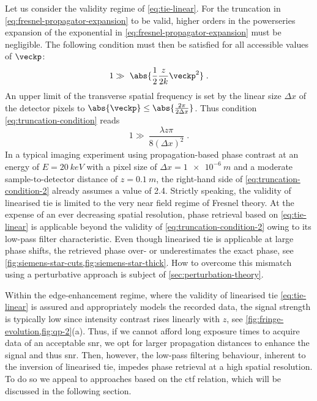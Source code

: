 \documentclass[
twoside,
openright,
titlepage,
numbers=noenddot,
headinclude,
fleqn,
a4paper,
footinclude=true,
cleardoublepage=empty,
abstractoff,
BCOR=5mm,
paper=a4,
fontsize=11pt,
british,ngerman,american,
]{scrreprt}
\begin{document}
Let us consider the validity regime of \cref{eq:tie-linear}.  For the
truncation in \cref{eq:fresnel-propagator-expansion} to be valid,
higher orders in the power\hyph series expansion of the exponential in
\cref{eq:fresnel-propagator-expansion} must be negligible.  The
following condition must then be satisfied for all accessible values
of $\veckp$:
\begin{equation}
  \label{eq:truncation-condition}
  1 \gg\ \abs{\frac12\frac{z}{2k}\veckp^2} \;.
\end{equation}
An upper limit of the transverse spatial frequency is set by the
linear size $\Delta x$ of the detector pixels to
$\abs{\veckp}\le\abs{\frac{2\pi}{2\Delta x}}$.  Thus condition
\eqref{eq:truncation-condition} reads
\begin{equation}
  \label{eq:truncation-condition-2}
  1 \gg\ \frac{\lambda z \pi}{8 (\Delta x)^2} \;.
\end{equation}
In a typical imaging experiment using propagation-based phase contrast
at an energy of $E=\SI{20}{keV}$ with a pixel size of $\Delta
x=\SI{1e-6}{m}$ and a moderate sample-to-detector distance of
$z=\SI{0.1}{m}$, the right-hand side of
\eqref{eq:truncation-condition-2} already assumes a value of 2.4.
Strictly speaking, the validity of linearised \ac{tie} is limited to
the very near field regime of Fresnel theory.  At the expense of an
ever decreasing spatial resolution, phase retrieval based on
\cref{eq:tie-linear} is applicable beyond the validity of
\cref{eq:truncation-condition-2} owing to its low-pass filter
characteristic.  Even though linearised \ac{tie} is applicable at
large phase shifts, the retrieved phase over- or underestimates the
exact phase, see \cref{fig:siemens-star-cuts,fig:siemens-star-thick}.
How to overcome this mismatch using a perturbative approach is subject
of \cref{sec:perturbation-theory}.

Within the edge-enhancement regime, where the validity of linearised
\ac{tie} \eqref{eq:tie-linear} is assured and appropriately models the
recorded data, the signal strength is typically low since intensity
contrast rises linearly with $z$, see
\cref{fig:fringe-evolution,fig:qp-2}(a).  Thus, if we cannot afford
long exposure times to acquire data of an acceptable \ac{snr}, we opt
for larger propagation distances to enhance the signal and thus 
\ac{snr}.  Then, however, the low-pass filtering behaviour, inherent
to the inversion of linearised \ac{tie}, impedes phase retrieval at a
high spatial resolution.  To do so we appeal to approaches based on
the \ac{ctf} relation, which will be discussed in the following
section.
\end{document}
